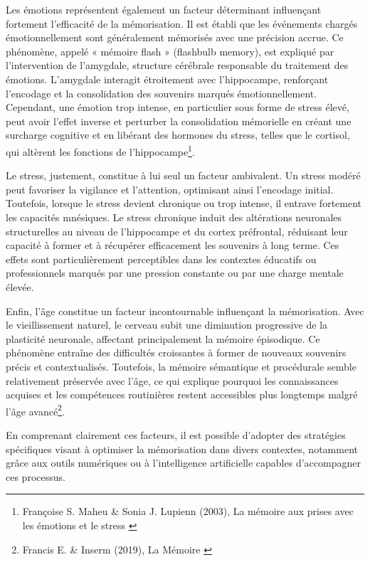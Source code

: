 \documentclass[11pt,a4paper]{report}
\begin{document}
Les émotions représentent également un facteur déterminant influençant fortement l’efficacité de la mémorisation. Il est établi que les événements chargés émotionnellement sont généralement mémorisés avec une précision accrue. Ce phénomène, appelé « mémoire flash » (flashbulb memory), est expliqué par l’intervention de l’amygdale, structure cérébrale responsable du traitement des émotions. L’amygdale interagit étroitement avec l’hippocampe, renforçant l’encodage et la consolidation des souvenirs marqués émotionnellement. Cependant, une émotion trop intense, en particulier sous forme de stress élevé, peut avoir l’effet inverse et perturber la consolidation mémorielle en créant une surcharge cognitive et en libérant des hormones du stress, telles que le cortisol, qui altèrent les fonctions de l’hippocampe\footnote{Françoise S. Maheu \& Sonia J. Lupienn (2003), La mémoire aux prises avec les émotions et le stress \cite{maheulupienn}}.

Le stress, justement, constitue à lui seul un facteur ambivalent. Un stress modéré peut favoriser la vigilance et l’attention, optimisant ainsi l’encodage initial. Toutefois, lorsque le stress devient chronique ou trop intense, il entrave fortement les capacités mnésiques. Le stress chronique induit des altérations neuronales structurelles au niveau de l’hippocampe et du cortex préfrontal, réduisant leur capacité à former et à récupérer efficacement les souvenirs à long terme. Ces effets sont particulièrement perceptibles dans les contextes éducatifs ou professionnels marqués par une pression constante ou par une charge mentale élevée.

Enfin, l’âge constitue un facteur incontournable influençant la mémorisation. Avec le vieillissement naturel, le cerveau subit une diminution progressive de la plasticité neuronale, affectant principalement la mémoire épisodique. Ce phénomène entraîne des difficultés croissantes à former de nouveaux souvenirs précis et contextualisés. Toutefois, la mémoire sémantique et procédurale semble relativement préservée avec l’âge, ce qui explique pourquoi les connaissances acquises et les compétences routinières restent accessibles plus longtemps malgré l’âge avancé\footnote{Francis E. \& Inserm (2019), La Mémoire \cite{inserm}}.

En comprenant clairement ces facteurs, il est possible d’adopter des stratégies spécifiques visant à optimiser la mémorisation dans divers contextes, notamment grâce aux outils numériques ou à l’intelligence artificielle capables d’accompagner ces processus.
\end{document}
